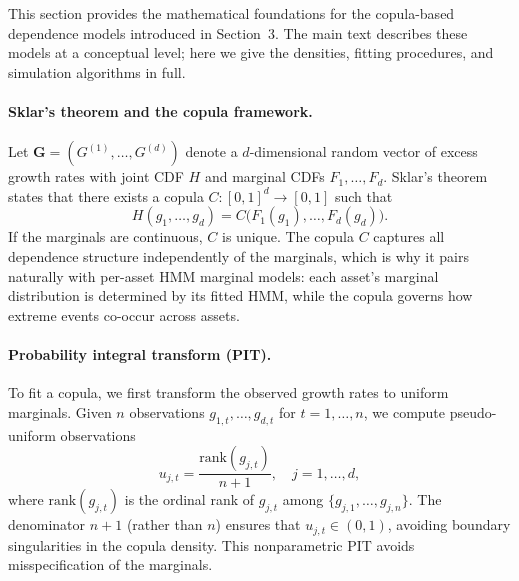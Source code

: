 This section provides the mathematical foundations for the copula-based dependence models introduced in Section~3. The main text describes these models at a conceptual level; here we give the densities, fitting procedures, and simulation algorithms in full.

\paragraph{Sklar's theorem and the copula framework.}
Let $\mathbf{G} = (G^{(1)}, \dots, G^{(d)})$ denote a $d$-dimensional random vector of excess growth rates with joint CDF $H$ and marginal CDFs $F_1, \dots, F_d$. Sklar's theorem \cite{embrechts_copulas_2002} states that there exists a copula $C: [0,1]^d \to [0,1]$ such that
\begin{equation}
    H(g_1, \dots, g_d) = C\bigl(F_1(g_1), \dots, F_d(g_d)\bigr).
    \label{eq:sklar}
\end{equation}
If the marginals are continuous, $C$ is unique. The copula $C$ captures all dependence structure independently of the marginals, which is why it pairs naturally with per-asset HMM marginal models: each asset's marginal distribution is determined by its fitted HMM, while the copula governs how extreme events co-occur across assets.

\paragraph{Probability integral transform (PIT).}
To fit a copula, we first transform the observed growth rates to uniform marginals. Given $n$ observations $g_{1,t}, \dots, g_{d,t}$ for $t = 1, \dots, n$, we compute pseudo-uniform observations
\begin{equation}
    u_{j,t} = \frac{\text{rank}(g_{j,t})}{n+1}, \quad j = 1, \dots, d,
    \label{eq:pit}
\end{equation}
where $\text{rank}(g_{j,t})$ is the ordinal rank of $g_{j,t}$ among $\{g_{j,1}, \dots, g_{j,n}\}$. The denominator $n+1$ (rather than $n$) ensures that $u_{j,t} \in (0,1)$, avoiding boundary singularities in the copula density. This nonparametric PIT avoids misspecification of the marginals.

